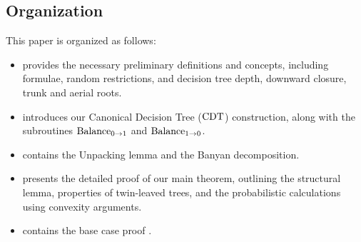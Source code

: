 \subsection{Organization}
\label{sec:organization}
This paper is organized as follows:
\begin{itemize}
    \item {} provides the necessary preliminary definitions and concepts, including \demorgan formulae, random restrictions, and decision tree depth, downward closure, trunk and aerial roots. 
    \item {} introduces our Canonical Decision Tree ($\operatorname{CDT}$) construction, along with the subroutines $\operatorname{Balance_{0 \to 1}}$ and $\operatorname{Balance_{1 \to 0}}$. 
    \item {} contains the Unpacking lemma and the Banyan decomposition. 
    \item {} presents the detailed proof of our main theorem, outlining the structural lemma, properties of twin-leaved trees, and the probabilistic calculations using convexity arguments.
    \item  {} contains the base case proof \hastad. 
\end{itemize}

